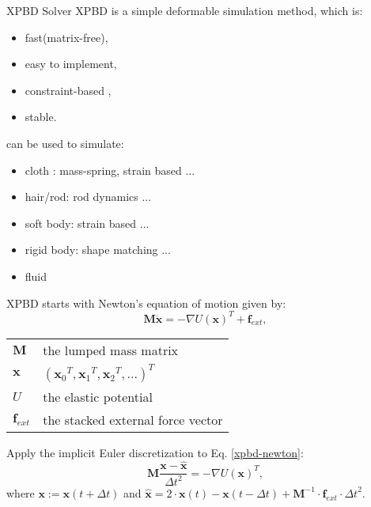 
\newcommand\EqRef[1]{(\ref{#1})}
\newcommand\SepLine{~\\}

\begin{frame}{XPBD Solver}
XPBD is a simple deformable simulation method, which is:
\begin{itemize}
    \item fast(matrix-free),
    \item easy to implement,
    \item constraint-based ,
    \item stable.
\end{itemize}
can be used to simulate:
\begin{itemize}
    \item cloth : mass-spring, strain based ...
    \item hair/rod: rod dynamics ...
    \item soft body: strain based ...
    \item rigid body: shape matching ...
    \item fluid
\end{itemize}
\end{frame}

\begin{frame}
XPBD starts with Newton's equation of motion given by:
\begin{equation}
    \mathbf{M} \ddot{\mathbf{x}}=-\nabla U\left(\mathbf{x}\right)^T + \mathbf{f}_{ext},\label{xpbd-newton}
\end{equation}

\begin{table}[]
\begin{tabular}{ll}
    $\mathbf{M}$ &  the lumped mass matrix \\
    $\mathbf{x}$ & $\left({\mathbf{x}_0}^T,{\mathbf{x}_1}^T,{\mathbf{x}_2}^T,...\right)^T$  \\
    $U$          & the elastic potential \\
    $\mathbf{f}_{ext}$ & the stacked external force vector
\end{tabular}
\end{table}

Apply the implicit Euler discretization to Eq. \ref{xpbd-newton}:
\begin{equation}
    \mathbf{M}\frac{\mathbf{x}-\hat{\mathbf{x}}}{\Delta t^2}=-\nabla U(\mathbf{x})^T, 
    \label{ipg}
\end{equation}
where $\mathbf{x}:= \mathbf{x}(t + \Delta t)$ and $\hat{\mathbf{x}}= 
2 \cdot \mathbf{x}(t)
- \mathbf{x}(t - \Delta t)
+ \mathbf{M}^{-1} \cdot \mathbf{f}_{ext} \cdot {\Delta t}^2$.
\end{frame}

